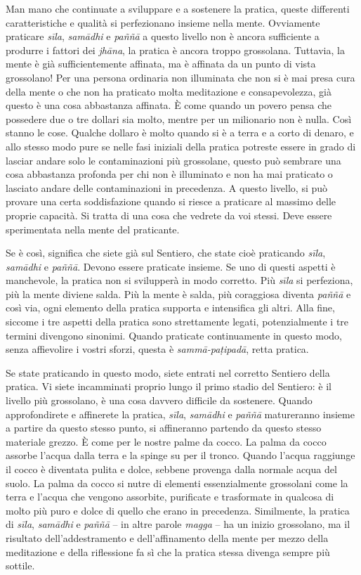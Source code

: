 Man mano che continuate a sviluppare e a sostenere la pratica, queste
differenti caratteristiche e qualità si perfezionano insieme nella
mente. Ovviamente praticare \emph{sīla}, \emph{samādhi} e \emph{paññā} a
questo livello non è ancora \mbox{sufficiente} a produrre i fattori dei
\emph{jhāna}, la pratica è ancora troppo
grossolana. Tuttavia, la mente è già sufficientemente affinata, ma è
affinata da un punto di vista grossolano! Per una persona ordinaria non
illuminata che non si è mai presa cura della mente o che non ha
praticato molta meditazione e consapevolezza, già questo è una cosa
abbastanza affinata. È come quando un povero pensa che possedere due o
tre dollari sia molto, mentre per un milionario non è nulla. Così stanno
le cose. Qualche dollaro è molto quando si è a terra e a corto di
denaro, e allo stesso modo pure se nelle fasi iniziali della pratica
potreste essere in grado di lasciar andare solo le contaminazioni più
grossolane, questo può sembrare una cosa abbastanza profonda per chi non
è illuminato e non ha mai praticato o lasciato andare delle
contaminazioni in precedenza. A questo livello, si può provare una certa
soddisfazione quando si riesce a praticare al massimo delle proprie
capacità. Si tratta di una cosa che vedrete da voi stessi. Deve essere
sperimentata nella mente del praticante.

Se è così, significa che siete già sul Sentiero, che state cioè
praticando \emph{sīla}, \emph{samādhi} e \emph{paññā}. Devono essere
praticate insieme. Se uno di questi aspetti è manchevole, la pratica non
si svilupperà in modo corretto. Più \emph{sīla} si perfeziona, più la
mente diviene salda. Più la mente è salda, più coraggiosa diventa
\emph{paññā} e così via, ogni elemento della pratica supporta e
intensifica gli altri. Alla fine, siccome i tre aspetti della pratica
sono strettamente legati, potenzialmente i tre termini divengono
sinonimi. Quando praticate continuamente in questo modo, senza
affievolire i vostri sforzi, questa è \emph{sammā-paṭipadā}, retta
pratica.

Se state praticando in questo modo, siete entrati nel corretto Sentiero
della pratica. Vi siete incamminati proprio lungo il primo stadio del
Sentiero: è il livello più grossolano, è una cosa davvero difficile da
sostenere. Quando approfondirete e affinerete la pratica, \emph{sīla},
\emph{samādhi} e \emph{paññā} matureranno insieme a partire da questo
stesso punto, si affineranno partendo da questo stesso materiale grezzo.
È come per le nostre palme da cocco. La palma da cocco assorbe l'acqua
dalla terra e la spinge su per il tronco. Quando l'acqua raggiunge il
cocco è diventata pulita e dolce, sebbene provenga dalla normale acqua
del suolo. La palma da cocco si nutre di elementi essenzialmente
grossolani come la terra e l'acqua che vengono assorbite, purificate e
trasformate in qualcosa di molto più puro e dolce di quello che erano in
precedenza. Similmente, la pratica di \emph{sīla}, \emph{samādhi} e
\emph{paññā} -- in altre parole \emph{magga} -- ha un inizio grossolano,
ma il risultato dell'addestramento e dell'affinamento della mente per
mezzo della meditazione e della riflessione fa sì che la pratica stessa
divenga sempre più sottile.

